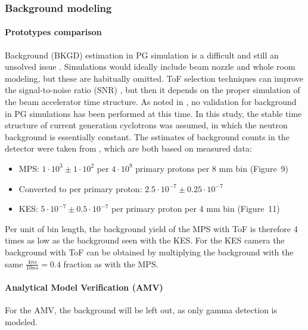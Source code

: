 \documentclass[a4paper,english,12pt]{article}
\begin{document}
\subsubsection{Background modeling}

\paragraph{Prototypes comparison}

Background (BKGD) estimation in PG simulation is a difficult and still an unsolved issue \citep{Huisman2016,Sterpin2015,Pinto2014a,Perali2014}. Simulations would ideally include beam nozzle and whole room modeling, but these are habitually omitted. ToF selection techniques can improve the signal-to-noise ratio (SNR) \citep{Testa2008,Roellinghoff2014a}, but then it depends on the proper simulation of the beam accelerator time structure. As noted in \cite{Huisman2016}, no validation for background in PG simulations has been performed at this time. In this study, the stable time structure of current generation cyclotrons was assumed, in which the neutron background is essentially constant. The sstimates of background counts in the detector were taken from \cite{Pinto2014a,Perali2014}, which are both based on measured data:

\begin{itemize}[noitemsep]
\item MPS: \cite{Pinto2014a} $1 \cdot 10^{3} \pm 1 \cdot 10^{2}$ per $4\cdot10^9$ primary protons per 8 mm bin (Figure~9)
\item[] Converted to per primary proton: $2.5 \cdot 10^{-7} \pm 0.25 \cdot 10^{-7}$
\item KES: \cite{Perali2014} $5 \cdot 10^{-7} \pm 0.5 \cdot 10^{-7}$ per primary proton per 4 mm bin (Figure~11)
\end{itemize}

Per unit of bin length, the background yield of the MPS with ToF is therefore 4 times as low as the background seen with the KES. For the KES camera the background with ToF can be obtained by multiplying the background with the same $\frac{4 ns}{10 ns} = 0.4$ fraction as with the MPS. 

\paragraph{Analytical Model Verification (AMV)}

For the AMV, the background will be left out, as only gamma detection is modeled.
\end{document}
